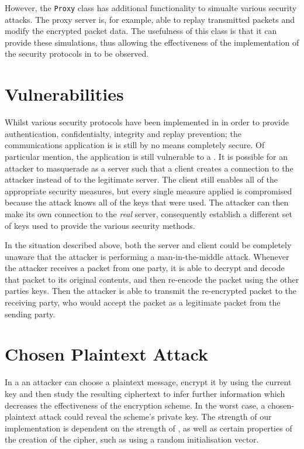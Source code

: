 \documentclass[a4paper,11pt]{article}
\begin{document}
However, the \verb+Proxy+ class has additional functionality to simualte 
various security attacks. The proxy server is, for example, able to replay 
transmitted packets and modify the encrypted packet data. The usefulness of this
class is that it can provide these simulations, thus allowing the effectiveness
of the implementation of the security protocols in \serviceName{} to be 
observed.

\section{Vulnerabilities}
Whilst various security protocols have been implemented in \serviceName{} in 
order to provide authentication, confidentialty, integrity and replay 
prevention; the communications application is is still by no means completely
secure. Of particular mention, the application is still vulnerable to a 
. It is possible for an attacker to 
masquerade as a \serviceName{} server such that a client creates a connection to
the attacker instead of to the legitimate server. The client still enables all 
of the appropriate security measures, but every single measure applied is 
compromised because the attack knows all of the keys that were used. The 
attacker can then make its own connection to the \emph{real} \serviceName{} 
server, consequently establish a different set of keys used to provide the 
various security methods.

In the situation described above, both the server and client could be 
completely unaware that the attacker is performing a man-in-the-middle attack. 
Whenever the attacker receives a packet from one party, it is able to decrypt 
and decode that packet to its original contents, and then re-encode the packet 
using the other parties keys. Then the attacker is able to transmit the 
re-encrypted packet to the receiving party, who would accept the packet as a
legitimate packet from the sending party.

\section{Chosen Plaintext Attack}
In a  an attacker can choose a plaintext 
message, encrypt it by using the current key and then study the resulting 
ciphertext to infer further information which decreases the effectiveness of the 
encryption scheme. In the worst case, a chosen-plaintext attack could reveal the
scheme's private key. The strength of our \packageName{} implementation is 
dependent on the strength of , as well as certain 
properties of the creation of the  cipher, such as using a 
random initialisation vector.
\end{document}
